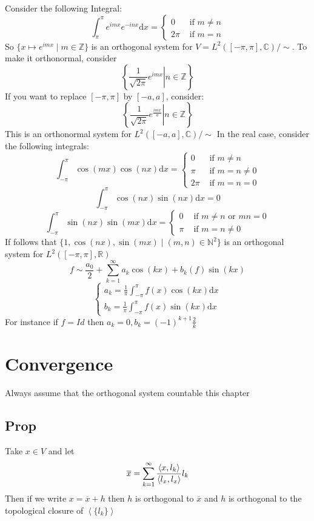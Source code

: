 \documentclass{book}
\begin{document}
Consider the following Integral:
$$\int_{\pi}^\pi e^{imx}e^{-inx}\text{d}x=\begin{cases}
    0 & \text{ if }m\neq n\\2\pi&\text{ if }m=n
\end{cases}$$
So $\{x\mapsto e^{imx}\mid m\in \mathbb{Z}\}$ is an orthogonal system for $V=L^2([-\pi,\pi],\mathbb{C})/\sim$. To make it orthonormal, consider
$$\left\{\left.\frac{1}{\sqrt{2\pi}}e^{imx}\right| n\in \mathbb{Z}\right\}$$
If you want to replace $[-\pi,\pi]$ by $[-a,a]$, consider:
$$\left\{\left.\frac{1}{\sqrt{2\pi}}e^{\frac{imx}a}\right| n\in \mathbb{Z}\right\}$$
This is an orthonormal system for $L^2([-a,a],\mathbb{C})/\sim$ In the real case, consider the following integrals:
$$\int_{-\pi}^\pi\cos(mx)\cos(nx)\text{d}x=\begin{cases}
    0 & \text{ if }m\neq n\\\pi &\text{ if }m=n\neq0\\2\pi&\text{ if }m=n=0
\end{cases}$$
$$\int_{-\pi}^\pi\cos(nx)\sin(nx)\text{d}x=0$$
$$\int_{-\pi}^\pi\sin(nx)\sin(mx)\text{d}x=\begin{cases}
    0 & \text{ if }m\neq n\text{ or }mn=0\\\pi &\text{ if }m=n\neq0
\end{cases}$$
If follows that $\{1,\cos(nx),\sin(mx)\mid(m,n)\in \mathbb{N}^2\}$ is an orthogonal system for $L^2([-\pi,\pi],\mathbb{R})$
$$f\sim\frac{a_0}{2}+\sum\limits_{k=1}^\infty a_k\cos(kx)+b_k(f)\sin(kx)$$
$$\begin{cases}
    a_k=\frac{1}\pi\int_{-\pi}^\pi f(x)\cos(kx)\text{d}x\\
    b_k=\frac{1}\pi\int_{-\pi}^\pi f(x)\sin(kx)\text{d}x
\end{cases}$$
For instance if $f=Id$ then $a_k=0,b_k=(-1)^{k+1}\frac{2}{k}$
\chapter{Convergence}
Always assume that the orthogonal system countable this chapter
\section{Prop}Take $x\in V$ and let$$\overline x=\sum\limits_{k=1}^\infty\frac{\left<x,l_k\right>}{\left<l_x,l_x\right>}l_k$$
Then if we write $x=\overline x+h$ then $h$ is orthogonal to $\overline{x}$ and $h$ is orthogonal to the topological closure of $\left<\{l_k\}\right>$
\end{document}
